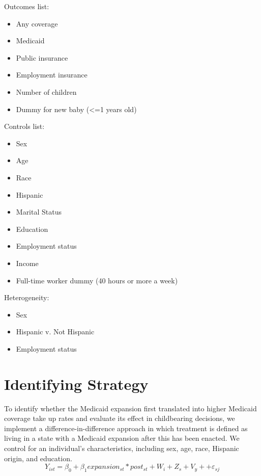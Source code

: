\documentclass{article}
\begin{document}
Outcomes list:
\begin{itemize}
    \item Any coverage
    \item Medicaid
    \item Public insurance
    \item Employment insurance
    \item Number of children
    \item Dummy for new baby (<=1 years old)

\end{itemize}

Controls list:
\begin{itemize}
    \item Sex
    \item Age
    \item Race
    \item Hispanic
    \item Marital Status %
    \item Education
    \item Employment status
    \item Income
    \item Full-time worker dummy (40 hours or more a week)
\end{itemize}

Heterogeneity:
\begin{itemize}
    \item Sex
    \item Hispanic v. Not Hispanic
    \item Employment status
\end{itemize}

\section{Identifying Strategy}
To identify whether the Medicaid expansion first translated into higher Medicaid coverage take up rates and evaluate its effect in childbearing decisions, we implement a difference-in-difference approach in which treatment is defined as living in a state with a Medicaid expansion after this has been enacted. We control for an individual's characteristics, including sex, age, race, Hispanic origin, and education. 
\begin{equation}
    Y_{ist} = \beta_0 + \beta_1 expansion_{st}*post_{st} +  W_{i} + Z_{s} + V_{y}+ + \varepsilon_{sj}
\end{equation}
\end{document}
